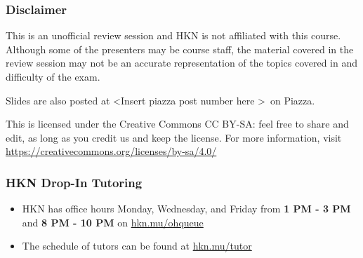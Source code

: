 \providecommand{\SlideAccessingLogistics}{\textless Insert piazza post number here \textgreater}
\providecommand{\SlidesLocation}{\textless Slides location and/or link \textgreater}
\providecommand{\PresenterHours}{\textless Itemize the presenter hours here \textgreater}

\begin{frame}

\titlepage

\end{frame}

\begin{frame}[t]\vspace{20pt}
\frametitle{Disclaimer}
This is an unofficial review session and HKN is not affiliated with this course. Although some of the presenters may be course staff, the material covered in the review session may not be an accurate representation of the topics covered in and difficulty of the exam.


Slides are also posted at \SlideAccessingLogistics\ on Piazza.

\begin{footnotesize}
  This is licensed under the Creative Commons CC BY-SA: feel free to share and edit, as long as you credit us and keep the license. For more information, visit
  \href{https://creativecommons.org/licenses/by-sa/4.0/}{https://creativecommons.org/licenses/by-sa/4.0/}
\end{footnotesize}

\vspace{20pt}

\end{frame}


\begin{frame}[t]\vspace{20pt}
\frametitle{HKN Drop-In Tutoring}

\begin{itemize}
  \item HKN has office hours Monday, Wednesday, and Friday from \textbf{1 PM - 3 PM} and \textbf{8 PM - 10 PM} on \href{https://hkn.mu/ohqueue}{hkn.mu/ohqueue}
  \item The schedule of tutors can be found at \href{https://hkn.mu/tutor}{hkn.mu/tutor}
\end{itemize}

\end{frame}
